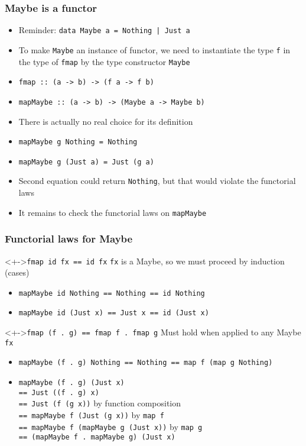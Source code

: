 \documentclass{beamer}
\begin{document}
\begin{frame}
  \frametitle{Maybe is a functor}
  \begin{itemize}[<+->]
  \item Reminder: \lstinline/data Maybe a = Nothing | Just a/
  \item To make \lstinline/Maybe/ an instance of functor, we need to instantiate
    the type \lstinline/f/ in the type of \lstinline|fmap| by the type constructor
    \lstinline|Maybe|
  \item \lstinline|fmap :: (a -> b) -> (f a -> f b)|
  \item \lstinline|mapMaybe :: (a -> b) -> (Maybe a -> Maybe b)|
  \item There is actually no real choice for its definition
  \item \lstinline|mapMaybe g Nothing = Nothing|
  \item \lstinline|mapMaybe g (Just a) = Just (g a)| 
  \item Second equation could return \lstinline|Nothing|, but that
    would violate the functorial laws
  \item It remains to check the functorial laws on \lstinline|mapMaybe|
  \end{itemize}
\end{frame}
\begin{frame}[fragile]
  \frametitle{Functorial laws for Maybe}
  \begin{block}<+->{\lstinline$fmap id fx == id fx$}
    \lstinline$fx$ is a Maybe, so we must proceed by induction (cases)
    \begin{itemize}
    \item \lstinline$mapMaybe id Nothing == Nothing == id Nothing$
    \item \lstinline$mapMaybe id (Just x) == Just x == id (Just x)$
    \end{itemize}
  \end{block}
  \begin{block}<+->{\lstinline/fmap (f . g) == fmap f . fmap g/}
    Must hold when applied to any Maybe \lstinline/fx/
    \begin{itemize}
    \item \lstinline$mapMaybe (f . g) Nothing == Nothing == map f (map g Nothing)$
    \item \lstinline$mapMaybe (f . g) (Just x)$ \\
      \lstinline$== Just ((f . g) x)$ 
      \\
      \lstinline$== Just (f (g x))$ by function composition
      \\
      \lstinline$== mapMaybe f (Just (g x))$ by \lstinline$map f$
      \\
      \lstinline$== mapMaybe f (mapMaybe g (Just x))$ by \lstinline$map g$
      \\
      \lstinline/== (mapMaybe f . mapMaybe g) (Just x)/
    \end{itemize}
  \end{block}
\end{frame}
\end{document}
